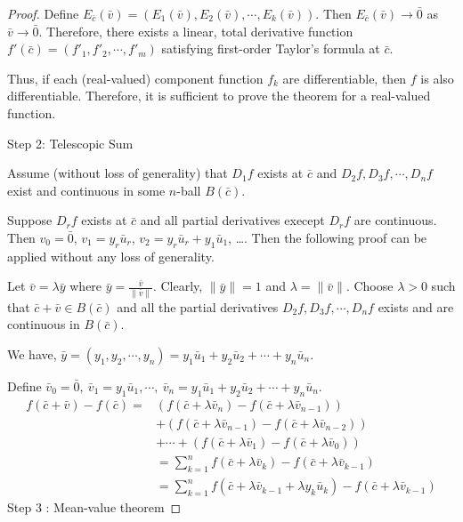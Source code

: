 \begin{proof}
Define $E_{\bar{c}}(\bar{v}) = \left( E_1(\bar{v}), E_2(\bar{v}), \cdots, E_k(\bar{v}) \right)$.
Then $E_{\bar{c}}(\bar{v}) \to \bar{0}$ as $\bar{v} \to \bar{0}$.
Therefore, there exists a linear, total derivative function $f'(\bar{c}) = \left( f'_1, f'_2, \cdots, f'_m \right)$ satisfying first-order Taylor's formula at $\bar{c}$.

Thus, if each (real-valued) component function $f_k$ are differentiable, then $f$ is also differentiable.
Therefore, it is sufficient to prove the theorem for a real-valued function.

Step 2: Telescopic Sum

Assume (without loss of generality) that $D_1f$ exists at $\bar{c}$ and $D_2f,D_3f,\cdots,D_nf$ exist and continuous in some $n$-ball $B(\bar{c})$.
\begin{commentary} Suppose $D_rf$ exists at $\bar{c}$ and all partial derivatives execept $D_rf$ are continuous.
	Then $v_0 = \bar{0}$, $v_1 = y_r\bar{u}_r$, $v_2 = y_r\bar{u}_r + y_1\bar{u}_1$, \dots.
Then the following proof can be applied without any loss of generality.
\end{commentary}

Let $\bar{v} = \lambda\bar{y}$ where $\bar{y} = \frac{\bar{v}}{\|\bar{v}\|}$.
Clearly, $\|\bar{y}\| = 1$ and $\lambda = \| \bar{v} \|$.
Choose $\lambda > 0$ such that $\bar{c}+\bar{v} \in B(\bar{c})$ and all the partial derivatives $D_2f, D_3f, \cdots, D_nf$ exists and are continuous in $B(\bar{c})$.

	We have, $\bar{y} = (y_1, y_2, \cdots, y_n) = y_1 \bar{u}_1 + y_2 \bar{u}_2 + \cdots + y_n \bar{u}_n$.

	Define $\bar{v}_0 = \bar{0},\ \bar{v}_1 = y_1\bar{u}_1, \cdots, \ \bar{v}_n = y_1 \bar{u}_1 + y_2 \bar{u}_2 + \cdots + y_n \bar{u}_n$.
\begin{align*}
	f(\bar{c}+\bar{v}) - f(\bar{c}) = & ( f(\bar{c}+\lambda{} \bar{v}_n) - f(\bar{c}+\lambda{} \bar{v}_{n-1}) ) \\
	& + ( f(\bar{c}+\lambda{} \bar{v}_{n-1}) - f(\bar{c}+\lambda{} \bar{v}_{n-2}) ) \\
	& + \cdots + ( f(\bar{c}+\lambda{} \bar{v}_1) - f(\bar{c}+\lambda{} \bar{v}_0) ) \\
	& = \sum_{k = 1}^n f(\bar{c} + \lambda{} \bar{v}_k) - f(\bar{c} + \lambda{} \bar{v}_{k-1}) \\
	& = \sum_{k = 1}^n f(\bar{c} + \lambda{} \bar{v}_{k-1} + \lambda{} y_k \bar{u}_k) - f(\bar{c} + \lambda{} \bar{v}_{k-1})
\end{align*}
Step 3 : Mean-value theorem


\end{proof}
